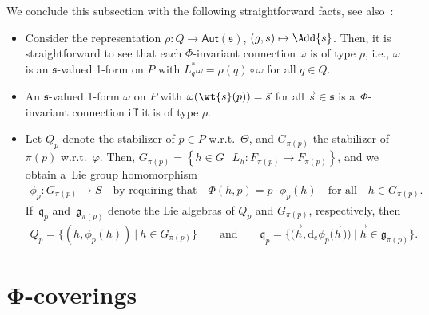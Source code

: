 \documentclass[pdftex]{sigma}
\numberwithin{equation}{section}
\begin{document}
We conclude this subsection with the following straightforward facts, see also~\cite{Wang}:
\begin{itemize}\itemsep=0pt
\item
Consider the representation $\rho\colon Q \rightarrow \mathsf{Aut}(\mathfrak{s})$, $(g,s)\mapsto \Add{s}$.
Then, it is straightforward to see that each $\Phi$-invariant connection $\omega$ is of type $\rho$, i.e., $\omega$ is an
$\mathfrak{s}$-valued 1-form on $P$ with $L_{q}^{*}\omega=\rho(q)\circ \omega$ for all $q\in Q$.
\item
An $\mathfrak{s}$-valued 1-form $\omega$ on $P$ with $\omega(\wt{s}(p))=\vec{s}$ for all $\vec{s}\in
\mathfrak{s}$ is a~$\Phi$-invariant connection if\/f it is of type $\rho$.
\item
Let $Q_{p}$ denote the stabilizer of $p\in P$ w.r.t.~$\Theta$, and $G_{\pi(p)}$ the stabilizer of
$\pi(p)$ w.r.t.~$\varphi$.
Then, $G_{\pi(p)}=\left\{h\in G\: | \:L_h\colon F_{\pi(p)}\rightarrow F_{\pi(p)} \right\}$, and we obtain a~Lie group homomorphism
\begin{gather*}
 \phi_p\colon G_{\pi(p)}\rightarrow S\quad\text{by requiring that}\quad \Phi(h,p)=p\cdot\phi_p(h)\quad\text{for all}\quad h\in
G_{\pi(p)}.
\end{gather*}
If~$\mathfrak{q}_p$ and~$\mathfrak{g}_{\pi(p)}$ denote the Lie algebras of $Q_p$ and $G_{\pi(p)}$, respectively, then
\begin{gather}
\label{eq:staoQ}
Q_p=\{(h,\phi_p(h))\:|\:h\in G_{\pi(p)}\}
\qquad
\text{and}
\qquad
\mathfrak{q}_p=\big\{\big(\vec{h},
\mathrm{d}_e\phi_p\big(\vec{h}\hspace{1pt}\big)\big)\:\big|\:\vec{h}\in
\mathfrak{g}_{\pi(p)}\big\}.
\end{gather}
\end{itemize}


\section[$\Phi$-coverings]{$\boldsymbol{\Phi}$-coverings}\label{sec:phiCoverings}
\end{document}
